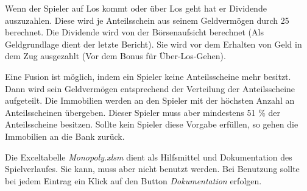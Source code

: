 \documentclass{article}
\begin{document}
	Wenn der Spieler auf Los kommt oder über Los geht hat er Dividende auszuzahlen. Diese wird je Anteilsschein aus seinem Geldvermögen durch 25 berechnet. Die Dividende wird von der Börsenaufsicht berechnet (Als Geldgrundlage dient der letzte Bericht). Sie wird vor dem Erhalten von Geld in dem Zug ausgezahlt (Vor dem Bonus für Über-Los-Gehen).
	
	Eine Fusion ist möglich, indem ein Spieler keine Anteilsscheine mehr besitzt. Dann wird sein Geldvermögen entsprechend der Verteilung der Anteilsscheine aufgeteilt. Die Immobilien werden an den Spieler mit der höchsten Anzahl an Anteilsscheinen übergeben. Dieser Spieler muss aber mindestens 51 \% der Anteilsscheine besitzen. Sollte kein Spieler diese Vorgabe erfüllen, so gehen die Immobilien an die Bank zurück.
	
	Die Exceltabelle \textit{Monopoly.xlsm} dient als Hilfsmittel und Dokumentation des Spielverlaufes. Sie kann, muss aber nicht benutzt werden. Bei Benutzung sollte bei jedem Eintrag ein Klick auf den Button \textit{Dokumentation} erfolgen.
	
\end{document}
